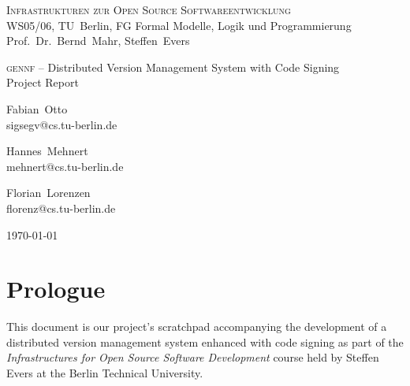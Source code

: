 \documentclass[fleqn, 10pt, a4paper]{article}
\newcommand{\GENNF}{\textsc{gennf}}
\begin{document}
\begin{center}
  {\scshape Infrastrukturen zur Open Source Softwareentwicklung} \\
  WS05/06, TU~Berlin, FG Formal Modelle, Logik und
  Programmierung \\
  Prof.~Dr.~Bernd~Mahr, Steffen~Evers
  \bigskip

  {\LARGE
    \GENNF{} -- Distributed Version Management System with Code Signing \\
    Project Report}
  \bigskip

  {\large
    \begin{minipage}[t]{0.25\linewidth}
      \begin{center}
        Fabian~Otto \\ \vspace{-2mm}
        {\scriptsize\ttfamily sigsegv@cs.tu-berlin.de}
      \end{center}
    \end{minipage}\hspace{8mm}
    \begin{minipage}[t]{0.25\linewidth}
      \begin{center}
        Hannes~Mehnert \\ \vspace{-2mm}
        {\scriptsize\ttfamily mehnert@cs.tu-berlin.de}
      \end{center}
    \end{minipage}\hspace{8mm}
    \begin{minipage}[t]{0.25\linewidth}
      \begin{center}
        Florian~Lorenzen \\ \vspace{-2mm}
        {\scriptsize\ttfamily florenz@cs.tu-berlin.de}
      \end{center}
    \end{minipage}
    \bigskip

    \today }

\end{center}
\bigskip

\tableofcontents


\section{Prologue}

This document is our project's scratchpad accompanying the development
of a distributed version management system enhanced with code signing as
part of the \emph{Infrastructures for Open Source Software Development}
course held by Steffen Evers at the Berlin Technical University.
\end{document}
